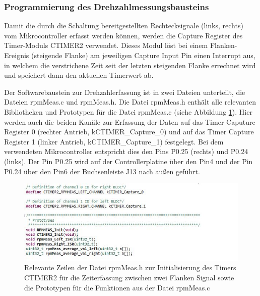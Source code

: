 \newpage
\subsubsection{Programmierung des Drehzahlmessungsbausteins}\label{Sec4Sub5Sub5}

Damit die durch die Schaltung bereitgestellten Rechtecksignale (links, rechts) vom Mikrocontroller erfasst werden können, werden die Capture Register des Timer-Moduls CTIMER2 verwendet. Dieses Modul löst bei einem Flanken-Ereignis (steigende Flanke) am jeweiligen Capture Input Pin einen Interrupt aus, in welchem die verstrichene Zeit seit der letzten steigenden Flanke errechnet wird und speichert dann den aktuellen Timerwert ab.\vspace{11pt}

Der Softwarebaustein zur Drehzahlerfassung ist in zwei Dateien unterteilt, die Dateien \glqq{}rpmMeas.c\grqq{} und \glqq{}rpmMeas.h\grqq{}. Die Datei \glqq{}rpmMeas.h\grqq{} enthält alle relevanten Bibliotheken und Prototypen für die Datei \glqq{}rpmMeas.c\grqq{} (siehe Abbildung \ref{fig:rpmMeasH}). Hier werden auch die beiden Kanäle zur Erfassung der Daten auf das Timer Caputure Register 0 (rechter Antrieb, \glqq{}kCTIMER\_Capture\_0\grqq{}) und auf das Timer Capture Register 1 (linker Antrieb, \glqq{}kCTIMER\_Capture\_1\grqq{}) festgelegt. Bei dem verwendeten Mikrocontroller entspricht dies den Pins P0.25 (rechts) und P0.24 (links). Der Pin P0.25 wird auf der Controllerplatine über den Pin4 und der Pin P0.24 über den Pin6 der Buchsenleiste J13 nach außen geführt.\vspace{11pt}

\begin{figure}[H] %
\includegraphics[width=.80\textwidth]{sec4/images/rpm_defines} 
\centering
\captionsetup{width=.95\textwidth}
\caption[Relevante Zeilen der Datei \glqq{}rpmMeas.h\grqq{}]{Relevante Zeilen der Datei \glqq{}rpmMeas.h\grqq{} zur Initialisierung des Timers CTIMER2 für die Zeiterfassung zwischen zwei Flanken Signal sowie die Prototypen für die Funktionen aus der Datei \glqq{}rpmMeas.c\grqq{}}\centering
\label{fig:rpmMeasH}
\end{figure}

